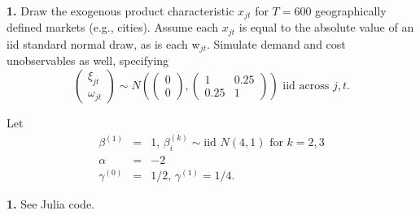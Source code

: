 \documentclass{article}
\begin{document}
\begin{tcolorbox}
\textbf{1.} Draw the exogenous product characteristic $x_{jt}$ for $T=600$
geographically defined markets (e.g., cities). Assume each $x_{jt}$ is equal
to the absolute value of an iid standard normal draw, as is each w$_{jt}$.
Simulate demand and cost unobservables as well, specifying
\begin{equation*}
\left(
\begin{array}{c}
\xi _{jt} \\
\omega _{jt}%
\end{array}%
\right) \sim N\left( \left(
\begin{array}{c}
0 \\
0%
\end{array}%
\right) ,\left(
\begin{array}{cc}
1 & 0.25 \\
0.25 & 1%
\end{array}%
\right) \right) \text{ iid across }j,t.
\end{equation*}

Let
\begin{eqnarray*}
\beta ^{(1)} &=&1\text{, }\beta _{i}^{\left( k\right) }\sim \text{iid }%
N\left( 4,1\right) \text{ for }k=2,3 \\
\alpha  &=&-2 \\
\gamma ^{(0)} &=&1/2\text{, }\gamma ^{(1)}=1/4.
\end{eqnarray*}
\end{tcolorbox}

\textbf{1.} See Julia code.
\end{document}
